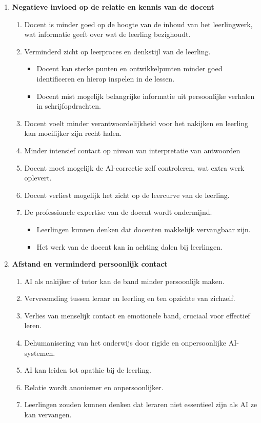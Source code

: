 \documentclass[12pt]{article}
\begin{document}
\begin{enumerate}
    \item \textbf{Negatieve invloed op de relatie en kennis van de docent}
        \begin{enumerate}
        \item Docent is minder goed op de hoogte van de inhoud van het leerlingwerk, wat informatie geeft over wat de leerling bezighoudt.
        \item Verminderd zicht op leerproces en denkstijl van de leerling.
        \begin{itemize}
        \item Docent kan sterke punten en ontwikkelpunten minder goed identificeren en hierop inspelen in de lessen.
        \item Docent mist mogelijk belangrijke informatie uit persoonlijke verhalen in schrijfopdrachten.
        \end{itemize}
        \item Docent voelt minder verantwoordelijkheid voor het nakijken en leerling kan moeilijker zijn recht halen.
        \item Minder intensief contact op niveau van interpretatie van antwoorden
        \item Docent moet mogelijk de AI-correctie zelf controleren, wat extra werk oplevert.
        \item Docent verliest mogelijk het zicht op de leercurve van de leerling.
        \item De professionele expertise van de docent wordt ondermijnd.
        \begin{itemize}
        \item Leerlingen kunnen denken dat docenten makkelijk vervangbaar zijn.
        \item Het werk van de docent kan in achting dalen bij leerlingen.
        \end{itemize}
    \end{enumerate}
\item \textbf{Afstand en verminderd persoonlijk contact}
    \begin{enumerate}
        \item   AI als nakijker of tutor kan de band minder persoonlijk maken.
        \item   Vervreemding tussen leraar en leerling en ten opzichte van zichzelf.
        \item    Verlies van menselijk contact en emotionele band, cruciaal voor effectief leren.
        \item   Dehumanisering van het onderwijs door rigide en onpersoonlijke AI-systemen.
        \item   AI kan leiden tot apathie bij de leerling.
        \item Relatie wordt anoniemer en onpersoonlijker.
        \item   Leerlingen zouden kunnen denken dat leraren niet essentieel zijn als AI ze kan vervangen.
    \end{enumerate}


\end{enumerate}
\end{document}
